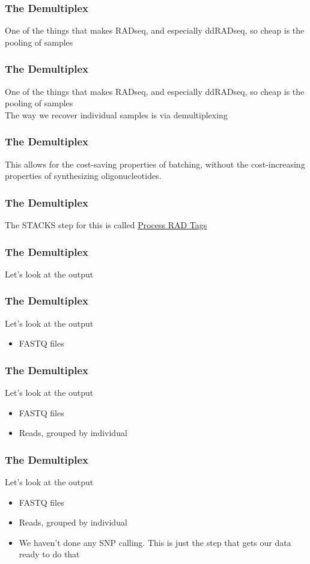 \documentclass{beamer}
\begin{document}
\begin{frame}
\frametitle{The Demultiplex}
One of the things that makes RADseq, and especially ddRADseq, so cheap is the pooling of samples
\end{frame}

\begin{frame}
\frametitle{The Demultiplex}
One of the things that makes RADseq, and especially ddRADseq, so cheap is the pooling of samples \\
The way we recover individual samples is via demultiplexing
\end{frame}

\begin{frame}
\frametitle{The Demultiplex}
This allows for the cost-saving properties of batching, without the cost-increasing properties of synthesizing oligonucleotides. 
\end{frame}

\begin{frame}
\frametitle{The Demultiplex}
The STACKS step for this is called \href{http://catchenlab.life.illinois.edu/stacks/comp/process_radtags.php}{Process RAD Tags} 
\end{frame}

\begin{frame}
\frametitle{The Demultiplex}
Let's look at the output
\end{frame}

\begin{frame}
\frametitle{The Demultiplex}
Let's look at the output
\begin{itemize}
\item FASTQ files
\end{itemize}
\end{frame}

\begin{frame}
\frametitle{The Demultiplex}
Let's look at the output
\begin{itemize}
\item FASTQ files
\item Reads, grouped by individual
\end{itemize}
\end{frame}

\begin{frame}
\frametitle{The Demultiplex}
Let's look at the output
\begin{itemize}
\item FASTQ files
\item Reads, grouped by individual
\item We haven't done any SNP calling. This is just the step that gets our data ready to do that
\end{itemize}
\end{frame}
\end{document}

